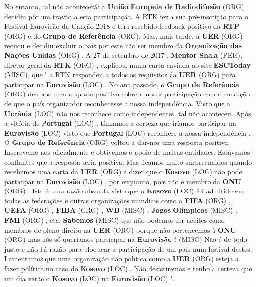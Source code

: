 \documentclass[12pt,a4paper]{article}
\begin{document}
No entanto, tal não acontecerá: a \textbf{União Europeia de Radiodifusão} (ORG) decidiu pôr um travão a esta participação. A RTK fez a sua pré-inscrição para o Festival Eurovisão da Canção 2018 e terá recebido feedback positivo da \textbf{RTP} (ORG) e do \textbf{Grupo de Referência} (ORG). Mas, mais tarde, a \textbf{UER} (ORG) recuou e decidiu excluir o país por este não ser membro da \textbf{Organização das Nações Unidas} (ORG) . A 27 de setembro de 2017 , \textbf{Mentor Shala} (PER), diretor-geral da \textbf{RTK} (ORG) , explicou, numa carta enviada ao site \textbf{ESCToday} (MISC), que " a RTK respondeu a todos os requisitos da \textbf{UER} (ORG) para participar na \textbf{Eurovisão} (LOC) . No ano passado, o \textbf{Grupo de Referência} (ORG) deu-nos uma resposta positiva sobre a nossa participação com a condição de que o país organizador reconhecesse a nossa independência. Visto que a \textbf{Ucrânia} (LOC) não nos reconhece como independentes, tal não aconteceu. Após a vitória de \textbf{Portugal} (LOC) , tínhamos a certeza que iríamos participar na \textbf{Eurovisão} (LOC) visto que \textbf{Portugal} (LOC) reconhece a nossa independência . O \textbf{Grupo de Referência} (ORG) voltou a dar-nos uma resposta positiva. Inscrevemo-nos oficialmente e obtivemos o apoio de muitas entidades. Estávamos confiantes que a resposta seria positiva. Mas ficamos muito surpreendidos quando recebemos uma carta da \textbf{UER} (ORG) a dizer que o \textbf{Kosovo} (LOC) não pode participar na \textbf{Eurovisão} (LOC) , por enquanto, pois não é membro da \textbf{ONU} (ORG) . Isto é uma razão absurda visto que o \textbf{Kosovo} (LOC) foi admitido em todas as federações e outras organizações mundiais como a \textbf{FIFA} (ORG) , \textbf{UEFA} (ORG) , \textbf{FIBA} (ORG) , \textbf{WB} (MISC) , \textbf{Jogos Olímpicos} (MISC) , \textbf{FMI} (ORG) , etc. \textbf{Sabemos} (MISC) que não podemos ser aceites como membros de pleno direito na \textbf{UER} (ORG) porque não pertencemos à \textbf{ONU} (ORG) mas nós só queríamos participar na \textbf{Eurovisão !} (MISC) Não é de todo justo e não há razão para bloquear a participação de um país num festival destes. Lamentamos que uma organização não política como a \textbf{UER} (ORG) esteja a fazer política no caso do \textbf{Kosovo} (LOC) . Não desistiremos e tenho a certeza que um dia verão o \textbf{Kosovo} (LOC) na \textbf{Eurovisão} (LOC) ".
\end{document}
